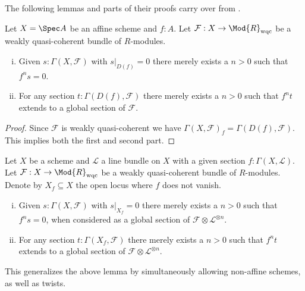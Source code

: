 The following lemmas and parts of their proofs carry over from \cite[Chapter II.5]{Hartshorne}.

\begin{lemma}
  \label{affine-extension-of-sections}
  Let $X = \Spec A$ be an affine scheme and $f:A$.
  Let $\mathcal F:X\to \Mod{R}_{\mathrm{wqc}}$ be a weakly quasi-coherent bundle of $R$-modules.
  \begin{enumerate}[(i)]
    \item Given $s:\Gamma (X,\mathcal F)$ with $s|_{D(f)} = 0$  there merely exists a $n>0$ such that $f^ns=0$.
    \item For any section $t:\Gamma(D(f),\mathcal F)$ there merely exists a $n>0$
      such that $f^nt$ extends to a global section of $\mathcal F$.
  \end{enumerate}
\end{lemma}

\begin{proof}
  Since $\mathcal F$ is weakly quasi-coherent we have $\Gamma (X,\mathcal F)_f = \Gamma (D(f),\mathcal F)$.
  This implies both the first and second part.
\end{proof}


\begin{lemma}
  \label{extension-of-sections-by-twisting}
  Let $X$ be a scheme and $\mathcal L$ a line bundle on $X$ with a given section $f:\Gamma (X,\mathcal L)$.
  Let $\mathcal F:X\to \Mod{R}_{\mathrm{wqc}}$ be a weakly quasi-coherent bundle of $R$-modules.
  Denote by $X_f \subseteq X$ the open locus where $f$ does not vanish.
  \begin{enumerate}[(i)]
    \item Given $s:\Gamma (X,\mathcal F)$ with $s|_{X_f} = 0$ there merely exists a $n>0$ such that $f^ns=0$,
      when considered as a global section of $\mathcal F \otimes \mathcal L^{\otimes n}$.
    \item For any section $t:\Gamma (X_f,\mathcal F)$ there merely exists a $n>0$
      such that $f^nt$ extends to a global section of $\mathcal F \otimes \mathcal L^{\otimes n}$.
  \end{enumerate}
\end{lemma}

This generalizes the above lemma by simultaneously allowing non-affine schemes, as well as twists.

